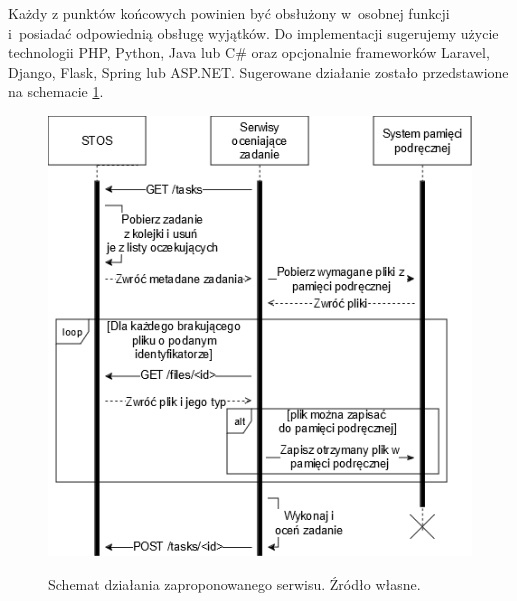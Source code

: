 Każdy z punktów końcowych powinien być obsłużony w~osobnej funkcji i~posiadać odpowiednią obsługę wyjątków. Do implementacji sugerujemy użycie technologii PHP, Python, Java lub C\# oraz opcjonalnie frameworków Laravel, Django, Flask, Spring lub ASP.NET. Sugerowane działanie zostało przedstawione na schemacie \ref{stos-suggestion}.
\begin{figure}[!h]
	\begin{center}
		\resizebox{1.0\textwidth}{!} {
			\includegraphics{img/5/stos-suggestion.png}
		}
		\caption[Schemat działania zaproponowanego serwisu. Źródło własne.]{Schemat działania zaproponowanego serwisu. Źródło własne.}
    \label{stos-suggestion}
	\end{center}
\end{figure}
